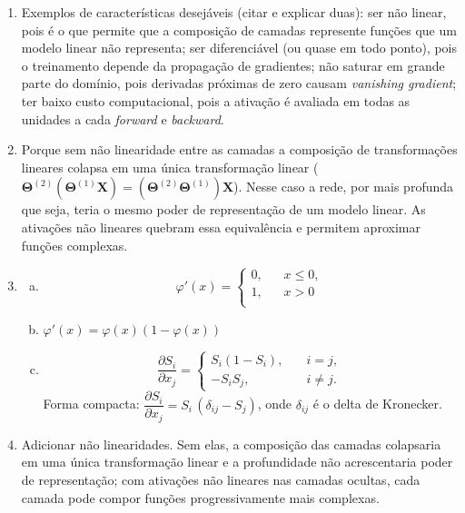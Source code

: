 \documentclass{dlproblemset}
\begin{document}
\begin{enumerate}[1)]
    \item Exemplos de características desejáveis (citar e explicar duas): ser não linear, pois é o que permite que a composição de camadas represente funções que um modelo linear não representa; ser diferenciável (ou quase em todo ponto), pois o treinamento depende da propagação de gradientes; não saturar em grande parte do domínio, pois derivadas próximas de zero causam \textit{vanishing gradient}; ter baixo custo computacional, pois a ativação é avaliada em todas as unidades a cada \textit{forward} e \textit{backward}.

    \item Porque sem não linearidade entre as camadas a composição de transformações lineares colapsa em uma única transformação linear ($\mathbf{\Theta}^{(2)}(\mathbf{\Theta}^{(1)} \mathbf{X}) = (\mathbf{\Theta}^{(2)}\mathbf{\Theta}^{(1)})\mathbf{X}$). Nesse caso a rede, por mais profunda que seja, teria o mesmo poder de representação de um modelo linear. As ativações não lineares quebram essa equivalência e permitem aproximar funções complexas.

    \item
    \begin{enumerate}[a)]
        \item \[
\varphi'(x) =
     \begin{cases}
       \text{0,} &\quad x \le0,\\
       \text{1,} &\quad x > 0\\
     \end{cases}
\]
        \item $\varphi'(x)=\varphi(x)(1-\varphi(x))$
        \item {} \[
        \frac{\partial S_i}{\partial x_j} =
     \begin{cases}
       S_i(1-S_i), &\quad i=j,\\
       -S_i S_j,   &\quad i\neq j.
     \end{cases}
\]
        Forma compacta: $\dfrac{\partial S_i}{\partial x_j} = S_i\,(\delta_{ij} - S_j)$, onde $\delta_{ij}$ é o delta de Kronecker.
    \end{enumerate}

    \item Adicionar não linearidades. Sem elas, a composição das camadas colapsaria em uma única transformação linear e a profundidade não acrescentaria poder de representação; com ativações não lineares nas camadas ocultas, cada camada pode compor funções progressivamente mais complexas.


\end{enumerate}
\end{document}
